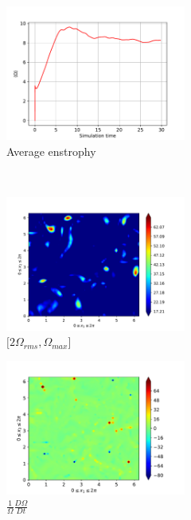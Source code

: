 \newpage

\begin{figure}[H]
    \begin{subfigure}[H]{0.45\textwidth}
        \includegraphics[height=1.75in]{media/run-cds-65/enst-average1335}
        \caption{Average enstrophy}
    \end{subfigure}
    ~
    \begin{subfigure}[H]{0.45\textwidth}
        \includegraphics[height=1.75in]{media/run-cds-65/enst-2-1335}
        \caption{$[2\Omega_{rms}, \Omega_{max} $] }
    \end{subfigure}
    \newline
    \begin{subfigure}[H]{0.45\textwidth}
        \includegraphics[height=1.75in]{media/run-cds-65/enst-1335}
        \caption{$\frac{1}{\Omega} \frac{D \Omega}{Dt}$}
    \end{subfigure}
    ~
    \begin{subfigure}{0.45\textwidth}

\end{subfigure}
\end{figure}
